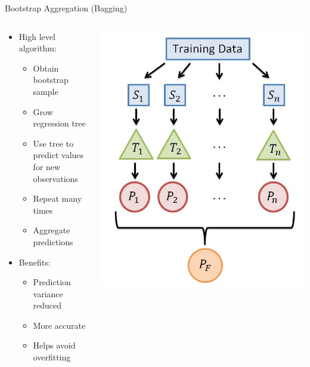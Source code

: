 \documentclass{beamer}
\begin{document}
	\begin{frame}{Bootstrap Aggregation (Bagging)}
		\begin{columns}
			\begin{column}{0.5\textwidth}
				\begin{itemize}
					\item High level algorithm:
					\begin{itemize}
						\item Obtain bootstrap sample
						\item Grow regression tree
						\item Use tree to predict values\\
						for new observations
						\item Repeat many times
						\item Aggregate predictions 
					\end{itemize}
					\item Benefits:
					\begin{itemize}
						\item Prediction variance reduced
						\item More accurate
						\item Helps avoid overfitting
					\end{itemize}
				\end{itemize}
			\end{column}
			\begin{column}{0.5\textwidth}
				\includegraphics[scale=.4]{baggingalg.jpg}
			\end{column}
		\end{columns}
	\end{frame}
\end{document}
